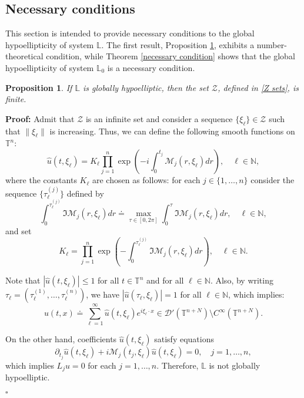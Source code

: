 \documentclass[12pt]{elsarticle}
\newtheorem{proposition}[theorem]{Proposition}
\numberwithin{equation}{section}
\newenvironment{proof}[1][\noindent \textbf{Proof: }]{#1}{ \hfill $\square$ \vspace{2mm}}
\begin{document}
\subsection{Necessary conditions}\label{sec necessary conditions}


This section is intended to provide necessary conditions   to the global hypoellipticity of system $\mathbb{L}$. The first result, Proposition \ref{Z infinity}, exhibits a number-theoretical condition, while Theorem \ref{necessary condition} shows that the global hypoellipticity of system $\mathbb{L}_0$ is a necessary condition.



\begin{proposition}\label{Z infinity} If $\mathbb{L}$ is globally hypoelliptic, then  the set  $\mathcal{Z}$, defined in \eqref{Z sets}, is finite.
\end{proposition}


\begin{proof}
	Admit that $\mathcal{Z}$ is an infinite set and consider a sequence $\{\xi_{\ell}\}\in \mathcal{Z}$ such that $\|\xi_{\ell}\|$ is increasing. Thus, we can define the following smooth functions on $\mathbb{T}^n$: 
	$$
	\widehat{u}(t,\xi_{\ell})=K_\ell \prod_{j=1}^{n}\exp\left(-i\int_{0}^{t_j}\mathcal{M}_j(r,\xi_{\ell})dr\right),\quad \ell\in\mathbb{N},
	$$  
	where the constants $K_\ell$ are chosen as follows: for each $j\in\{1,\ldots,n\}$ consider the sequence $\{\tau_{\ell}^{(j)}\}$ defined  by
	$$
	\int_{0}^{\tau_{\ell}^{(j)}} \Im \mathcal{M}_j(r,\xi_{\ell})dr\doteq \max_{\tau\in[0,2\pi]} 	\int_{0}^{\tau} \Im \mathcal{M}_j(r,\xi_{\ell})dr,\quad \ell\in\mathbb{N},
	$$ 
	and set  
	$$
	K_\ell= \prod_{j=1}^{n}\exp\left(-\int_{0}^{\tau_{\ell}^{(j)}}\Im\mathcal{M}_j(r,\xi_{\ell})dr\right),\quad \ell\in\mathbb{N}.
	$$
	
	Note that $|\widehat{u}(t,\xi_{\ell})|\leq 1$ for all $t\in\mathbb{T}^n$ and for all $\ell\in\mathbb{N}$. Also, by writing $\tau_{\ell}=(\tau_{\ell}^{(1)},\ldots,\tau_{\ell}^{(n)})$, we have $|\widehat{u}(\tau_{\ell},\xi_{\ell})|=1$ for all $\ell\in\mathbb{N}$, which implies:
	$$
	u(t,x)\doteq\sum_{\ell=1}^{\infty} \widehat{u}(t,\xi_{\ell})e^{i\xi_{\ell} \cdot x}\in \mathcal{D}'(\mathbb{T}^{n+N})\setminus C^{\infty}(\mathbb{T}^{n+N}).
	$$
	
	On the other hand,  coefficients $\widehat{u}(t,\xi_{\ell})$ satisfy  equations
	$$
	\partial_{t_j}\widehat{u}(t,\xi_\ell)+i\mathcal{M}_j(t_j,
	\xi_\ell)\widehat{u}(t,\xi_\ell)=0,\quad j=1,\ldots,n,
	$$
	which implies  $L_ju=0$ for each $j=1,\ldots,n$. Therefore, $\mathbb{L}$ is not globally hypoelliptic.
	
\end{proof}
\end{document}
